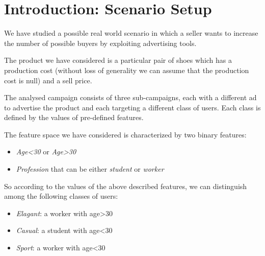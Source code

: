 \chapter{Introduction: Scenario Setup}
We have studied a possible real world scenario in which a seller wants to increase the number of possible buyers by exploiting advertising tools.

The product we have considered is a particular pair of shoes which has a production cost (without loss of generality we can assume that the production cost is null) and a sell price.

The analysed campaign consists of three sub-campaigns, each with a different ad to advertise the product and each targeting a different class of users. Each class is defined by the values of pre-defined features.

The feature space we have considered is characterized by two binary features: 
\begin{itemize}
\item \textit{Age<30} or \textit{Age>30}
\item \textit{Profession} that can be either \textit{student} or \textit{worker}
\end{itemize}

So according to the values of the above described features, we can distinguish among the following classes of users:
\begin{itemize}
\item \textit{Elagant}: a worker with age>30
\item \textit{Casual}: a student with age<30
\item \textit{Sport}: a worker with age<30
\end{itemize}
